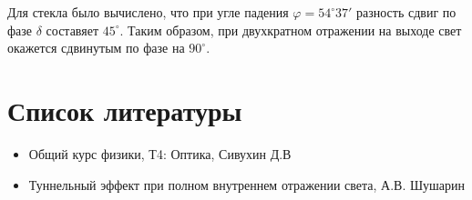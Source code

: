  	Для стекла было вычислено, что при угле падения $\varphi = 54^{\circ}37'$ разность сдвиг по фазе $\delta$ составяет $45^{\circ}$. Таким образом, при двухкратном отражении на выходе свет окажется сдвинутым по фазе на $90^{\circ}$. 
	 	
	 \section{Список литературы}
	 
	 \begin{itemize}
	 	\item Общий курс физики, Т4: Оптика, Сивухин Д.В
	 	\item Туннельный эффект при полном внутреннем отражении света, А.В. Шушарин
	 	
	 \end{itemize}


